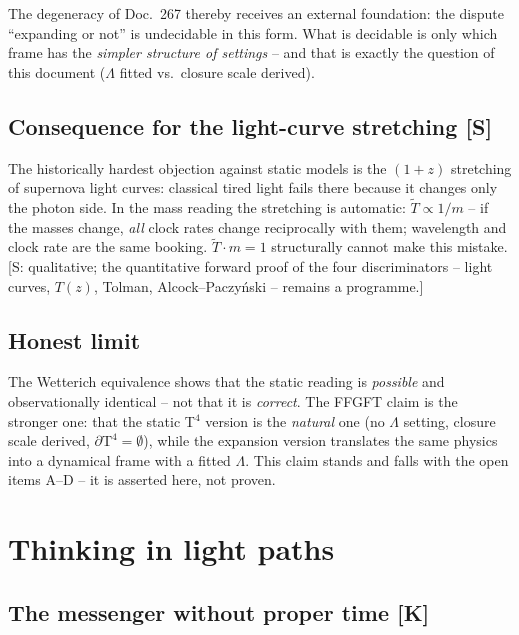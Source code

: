 The degeneracy of Doc.~267 thereby receives an external foundation:
the dispute \enquote{expanding or not} is undecidable in this form.
What is decidable is only which frame has the \emph{simpler
structure of settings} -- and that is exactly the question of this
document ($\Lambda$ fitted vs.\ closure scale derived).

\section{Consequence for the light-curve stretching [S]}

The historically hardest objection against static models is the
$(1+z)$ stretching of supernova light curves: classical tired
light fails there because it changes only the photon side. In the
mass reading the stretching is automatic:
$\tilde T \propto 1/m$ -- if the masses change, \emph{all} clock
rates change reciprocally with them; wavelength and clock rate are
the same booking. $\tilde T \cdot m = 1$ structurally cannot make
this mistake. [S: qualitative; the quantitative forward proof of
the four discriminators -- light curves, $T(z)$, Tolman,
Alcock--Paczyński -- remains a programme.]

\section{Honest limit}

The Wetterich equivalence shows that the static reading is
\emph{possible} and observationally identical -- not that it is
\emph{correct}. The FFGFT claim is the stronger one: that the
static T$^4$ version is the \emph{natural} one (no $\Lambda$
setting, closure scale derived, $\partial\text{T}^4 = \emptyset$),
while the expansion version translates the same physics into a
dynamical frame with a fitted $\Lambda$. This claim stands and
falls with the open items A--D -- it is asserted here, not proven.

\chapter{Thinking in light paths}

\section{The messenger without proper time [K]}

